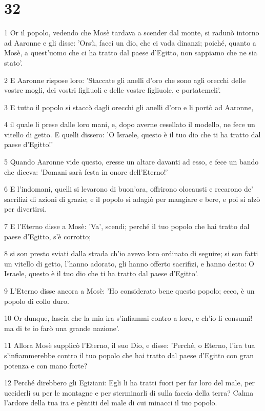 \chapter{32}

\par 1 Or il popolo, vedendo che Mosè tardava a scender dal monte, si radunò intorno ad Aaronne e gli disse: 'Orsù, facci un dio, che ci vada dinanzi; poiché, quanto a Mosè, a quest'uomo che ci ha tratto dal paese d'Egitto, non sappiamo che ne sia stato'.
\par 2 E Aaronne rispose loro: 'Staccate gli anelli d'oro che sono agli orecchi delle vostre mogli, dei vostri figliuoli e delle vostre figliuole, e portatemeli'.
\par 3 E tutto il popolo si staccò dagli orecchi gli anelli d'oro e li portò ad Aaronne,
\par 4 il quale li prese dalle loro mani, e, dopo averne cesellato il modello, ne fece un vitello di getto. E quelli dissero: 'O Israele, questo è il tuo dio che ti ha tratto dal paese d'Egitto!'
\par 5 Quando Aaronne vide questo, eresse un altare davanti ad esso, e fece un bando che diceva: 'Domani sarà festa in onore dell'Eterno!'
\par 6 E l'indomani, quelli si levarono di buon'ora, offrirono olocausti e recarono de' sacrifizi di azioni di grazie; e il popolo si adagiò per mangiare e bere, e poi si alzò per divertirsi.
\par 7 E l'Eterno disse a Mosè: 'Va', scendi; perché il tuo popolo che hai tratto dal paese d'Egitto, s'è corrotto;
\par 8 si son presto sviati dalla strada ch'io avevo loro ordinato di seguire; si son fatti un vitello di getto, l'hanno adorato, gli hanno offerto sacrifizi, e hanno detto: O Israele, questo è il tuo dio che ti ha tratto dal paese d'Egitto'.
\par 9 L'Eterno disse ancora a Mosè: 'Ho considerato bene questo popolo; ecco, è un popolo di collo duro.
\par 10 Or dunque, lascia che la mia ira s'infiammi contro a loro, e ch'io li consumi! ma di te io farò una grande nazione'.
\par 11 Allora Mosè supplicò l'Eterno, il suo Dio, e disse: 'Perché, o Eterno, l'ira tua s'infiammerebbe contro il tuo popolo che hai tratto dal paese d'Egitto con gran potenza e con mano forte?
\par 12 Perché direbbero gli Egiziani: Egli li ha tratti fuori per far loro del male, per ucciderli su per le montagne e per sterminarli di sulla faccia della terra? Calma l'ardore della tua ira e pèntiti del male di cui minacci il tuo popolo.
